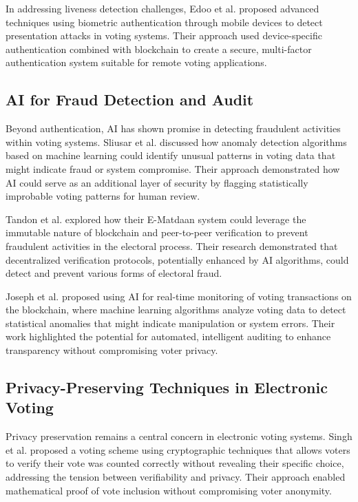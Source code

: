 \documentclass[conference]{IEEEtran}
\begin{document}
In addressing liveness detection challenges, Edoo et al. \cite{b7} proposed advanced techniques using biometric authentication through mobile devices to detect presentation attacks in voting systems. Their approach used device-specific authentication combined with blockchain to create a secure, multi-factor authentication system suitable for remote voting applications.

\subsection{AI for Fraud Detection and Audit}
Beyond authentication, AI has shown promise in detecting fraudulent activities within voting systems. Sliusar et al. \cite{b4} discussed how anomaly detection algorithms based on machine learning could identify unusual patterns in voting data that might indicate fraud or system compromise. Their approach demonstrated how AI could serve as an additional layer of security by flagging statistically improbable voting patterns for human review.

Tandon et al. \cite{b3} explored how their E-Matdaan system could leverage the immutable nature of blockchain and peer-to-peer verification to prevent fraudulent activities in the electoral process. Their research demonstrated that decentralized verification protocols, potentially enhanced by AI algorithms, could detect and prevent various forms of electoral fraud.

Joseph et al. \cite{b6} proposed using AI for real-time monitoring of voting transactions on the blockchain, where machine learning algorithms analyze voting data to detect statistical anomalies that might indicate manipulation or system errors. Their work highlighted the potential for automated, intelligent auditing to enhance transparency without compromising voter privacy.

\subsection{Privacy-Preserving Techniques in Electronic Voting}
Privacy preservation remains a central concern in electronic voting systems. Singh et al. \cite{b5} proposed a voting scheme using cryptographic techniques that allows voters to verify their vote was counted correctly without revealing their specific choice, addressing the tension between verifiability and privacy. Their approach enabled mathematical proof of vote inclusion without compromising voter anonymity.
\end{document}
